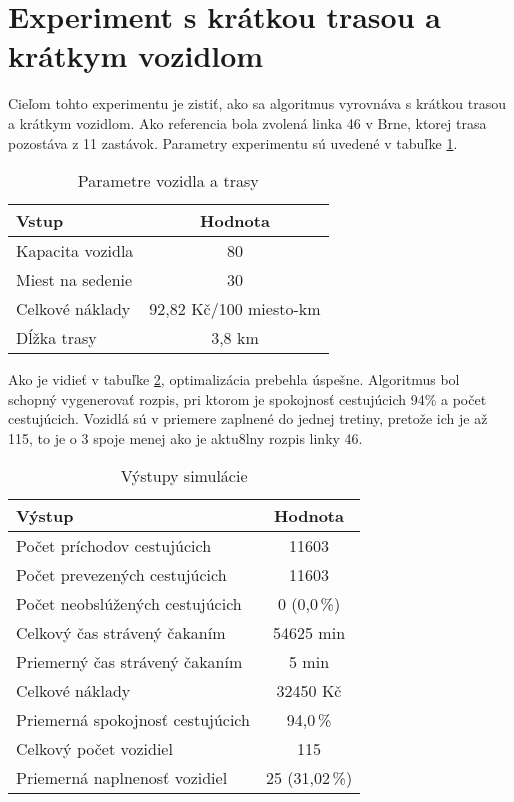 \newpage
\section{Experiment s krátkou trasou a krátkym vozidlom}
Cieľom tohto experimentu je zistiť, ako sa algoritmus vyrovnáva s krátkou trasou a krátkym vozidlom.
Ako referencia bola zvolená linka 46 v Brne, ktorej trasa pozostáva z 11 zastávok.
Parametry experimentu sú uvedené v tabuľke \ref{tab:shortDshortVin}.

\begin{table}[h]
  \centering
  \begin{tabular}{|l|c|}
    \hline
    \textbf{Vstup} & \textbf{Hodnota} \\ \hline
    Kapacita vozidla & 80 \\ \hline
    Miest na sedenie & 30 \\ \hline
    Celkové náklady & 92,82 Kč/100 miesto-km \\ \hline
    Dĺžka trasy & 3,8 km \\ \hline
  \end{tabular}
  \caption{Parametre vozidla a trasy}
  \label{tab:shortDshortVin}
\end{table}

Ako je vidieť v tabuľke \ref{tab:shortDshortVout}, optimalizácia prebehla úspešne.
Algoritmus bol schopný vygenerovať rozpis, pri ktorom je spokojnosť cestujúcich 94\% a počet cestujúcich.
Vozidlá sú v priemere zaplnené do jednej tretiny, pretože ich je až 115, to je o 3 spoje menej ako je aktu8lny rozpis linky 46.

\begin{table}[h]
  \centering
  \begin{tabular}{|l|c|}
    \hline
      \textbf{Výstup} & \textbf{Hodnota} \\ \hline
      Počet príchodov cestujúcich & 11603 \\ \hline
      Počet prevezených cestujúcich & 11603 \\ \hline
      Počet neobslúžených cestujúcich & 0 (0,0\,\%) \\ \hline
      Celkový čas strávený čakaním & 54625 min \\ \hline
      Priemerný čas strávený čakaním & 5 min \\ \hline
      Celkové náklady & 32450 Kč \\ \hline
      Priemerná spokojnosť cestujúcich & 94,0\,\% \\ \hline
      Celkový počet vozidiel & 115 \\ \hline
      Priemerná naplnenosť vozidiel & 25 (31,02\,\%) \\ \hline
  \end{tabular}
  \caption{Výstupy simulácie}
  \label{tab:shortDshortVout}
\end{table}

